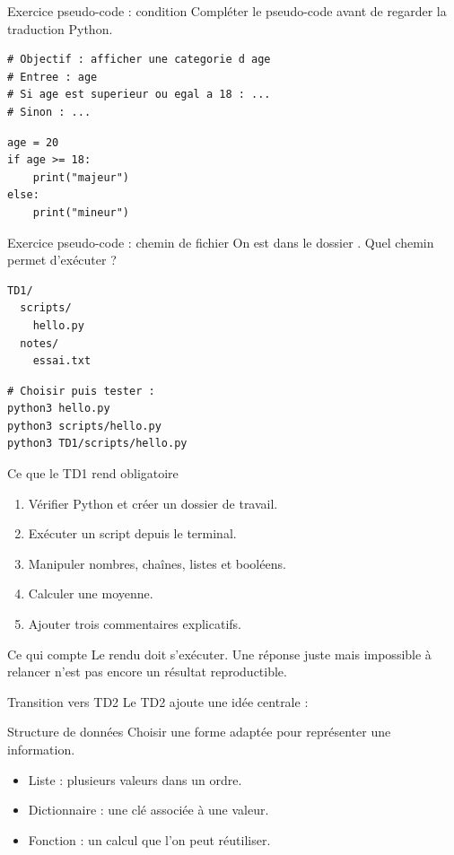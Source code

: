 \documentclass[10pt,aspectratio=169]{beamer}
\begin{document}
\begin{frame}[fragile]{Exercice pseudo-code : condition}
Compléter le pseudo-code avant de regarder la traduction Python.
\begin{lstlisting}
# Objectif : afficher une categorie d age
# Entree : age
# Si age est superieur ou egal a 18 : ...
# Sinon : ...
\end{lstlisting}
\pause
\begin{lstlisting}
age = 20
if age >= 18:
    print("majeur")
else:
    print("mineur")
\end{lstlisting}
\end{frame}

\begin{frame}[fragile]{Exercice pseudo-code : chemin de fichier}
On est dans le dossier . Quel chemin permet d’exécuter  ?
\begin{lstlisting}
TD1/
  scripts/
    hello.py
  notes/
    essai.txt
\end{lstlisting}
\begin{lstlisting}[language=terminal]
# Choisir puis tester :
python3 hello.py
python3 scripts/hello.py
python3 TD1/scripts/hello.py
\end{lstlisting}
\end{frame}

\begin{frame}{Ce que le TD1 rend obligatoire}
\begin{enumerate}
  \item Vérifier Python et créer un dossier de travail.
  \item Exécuter un script depuis le terminal.
  \item Manipuler nombres, chaînes, listes et booléens.
  \item Calculer une moyenne.
  \item Ajouter trois commentaires explicatifs.
\end{enumerate}
\begin{block}{Ce qui compte}
Le rendu doit s'exécuter. Une réponse juste mais impossible à relancer n'est pas encore un résultat reproductible.
\end{block}
\end{frame}

\begin{frame}{Transition vers TD2}
Le TD2 ajoute une idée centrale :
\begin{block}{Structure de données}
Choisir une forme adaptée pour représenter une information.
\end{block}
\begin{itemize}
  \item Liste : plusieurs valeurs dans un ordre.
  \item Dictionnaire : une clé associée à une valeur.
  \item Fonction : un calcul que l'on peut réutiliser.
\end{itemize}
\end{frame}
\end{document}
